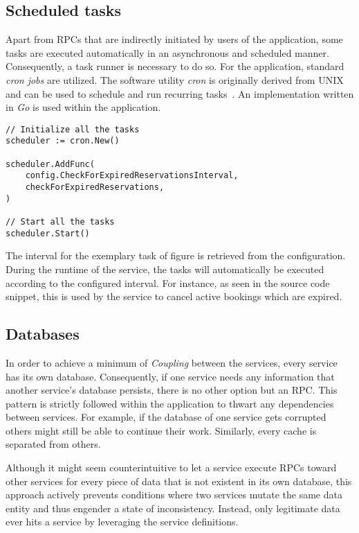 \documentclass[12pt,a4paper,twoside]{report}
\begin{document}
\subsection{Scheduled tasks}

Apart from RPCs that are indirectly initiated by users of the application,
some tasks are executed automatically in an asynchronous and scheduled manner.
Consequently, a task runner is necessary to do so.
For the application, standard \textit{cron jobs} are utilized.
The software utility \textit{cron} is originally derived from UNIX and can be
used to schedule and run recurring tasks~\cite{crontab}.
An implementation written in \textit{Go} is used within the application.

\begin{lstlisting}[title=services/fleet-monitor/bookings.go, float, floatplacement=H]
// Initialize all the tasks
scheduler := cron.New()

scheduler.AddFunc(
    config.CheckForExpiredReservationsInterval,
    checkForExpiredReservations,
)

// Start all the tasks
scheduler.Start()
\end{lstlisting}

The interval for the exemplary task of figure 
is retrieved from the configuration.
During the runtime of the service, the tasks will automatically be executed
according to the configured interval.
For instance, as seen in the source code snippet, this is used by the
 service to cancel active bookings which are expired.

\subsection{Databases} \label{subsect:databases}

In order to achieve a minimum of \textit{Coupling} between the services,
every service has its own database.
Consequently, if one service needs any information that another service's
database persists, there is no other option but an RPC.
This pattern is strictly followed within the application to thwart any
dependencies between services. For example, if the database of one service gets
corrupted others might still be able to continue their work.
Similarly, every cache is separated from others.

Although it might seem counterintuitive to let a service execute RPCs toward
other services for every piece of data that is not existent in its own database,
this approach actively prevents conditions where two services mutate the same
data entity and thus engender a state of inconsistency.
Instead, only legitimate data ever hits a service by leveraging the service definitions.
\end{document}
